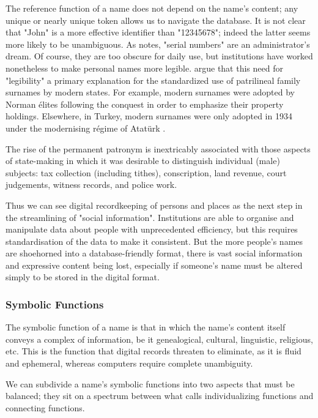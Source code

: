 The reference function of a name does not depend on the name's content; any
unique or nearly unique token allows us to navigate the database. It is not
clear that "John" is a more effective identifier than "12345678"; indeed the
latter seems more likely to be unambiguous. As \textcite{scott02} notes, "serial
numbers" are an administrator's dream. Of course, they are too obscure for daily
use, but institutions have worked nonetheless to make personal names more
legible. \textcite{scott02} argue that this need for "legibility" a primary
explanation for the standardized use of patrilineal family surnames by modern
states. For example, modern surnames were adopted by Norman élites following the
conquest in order to emphasize their property holdings. Elsewhere, in Turkey,
modern surnames were only adopted in 1934 under the modernising régime of
Atatürk \parencite{scott02}.

\begin{aquote}{\parencite{scott02}}
The rise of the permanent patronym is inextricably associated with those aspects
of state-making in which it was desirable to distinguish individual (male)
subjects: tax collection (including tithes), conscription, land revenue, court
judgements, witness records, and police work.
\end{aquote}

Thus we can see digital recordkeeping of persons and places as the next step in
the streamlining of "social information". Institutions are able to organise and
manipulate data about people with unprecedented efficiency, but this requires
standardisation of the data to make it consistent. But the more people's names
are shoehorned into a database-friendly format, there is vast social information
and expressive content being lost, especially if someone's name must be altered
simply to be stored in the digital format.

\subsubsection{Symbolic Functions}

The symbolic function of a name is that in which the name's content itself
conveys a
complex of information, be it genealogical,
cultural, linguistic, religious, etc. This is the function that
digital records threaten to eliminate, as it is fluid and ephemeral, whereas
computers require complete unambiguity.

We can subdivide a name's symbolic functions into two aspects that must be
balanced; they sit on a spectrum between what \textcite{finch08} calls
individualizing functions and connecting functions.

